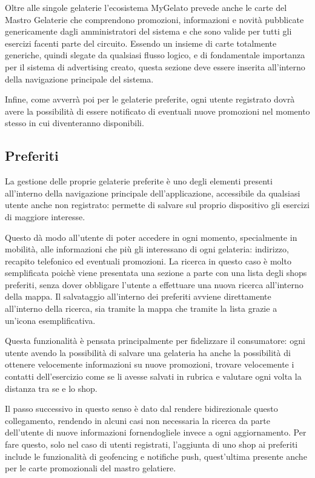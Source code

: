 Oltre alle singole gelaterie l'ecosistema MyGelato prevede anche le
carte del Mastro Gelaterie che comprendono promozioni, informazioni
e novità pubblicate genericamente dagli amministratori del sistema
e che sono valide per tutti gli esercizi facenti parte del circuito.
Essendo un insieme di carte totalmente generiche, quindi slegate da
qualsiasi flusso logico, e di fondamentale importanza per il sistema
di advertising creato, questa sezione deve essere inserita all'interno
della navigazione principale del sistema.\bigskip{}

Infine, come avverrà poi per le gelaterie preferite, ogni utente registrato
dovrà avere la possibilità di essere notificato di eventuali nuove
promozioni nel momento stesso in cui diventeranno disponibili.

\subsection{Preferiti}

La gestione delle proprie gelaterie preferite è uno degli elementi
presenti all'interno della navigazione principale dell'applicazione,
accessibile da qualsiasi utente anche non registrato: permette di
salvare sul proprio dispositivo gli esercizi di maggiore interesse.

Questo dà modo all'utente di poter accedere in ogni momento, specialmente
in mobilità, alle informazioni che più gli interessano di ogni gelateria:
indirizzo, recapito telefonico ed eventuali promozioni. La ricerca
in questo caso è molto semplificata poichè viene presentata una sezione
a parte con una lista degli shops preferiti, senza dover obbligare
l'utente a effettuare una nuova ricerca all'interno della mappa. Il
salvataggio all'interno dei preferiti avviene direttamente all'interno
della ricerca, sia tramite la mappa che tramite la lista grazie a
un'icona esemplificativa.\bigskip{}

Questa funzionalità è pensata principalmente per fidelizzare il consumatore:
ogni utente avendo la possibilità di salvare una gelateria ha anche
la possibilità di ottenere velocemente informazioni su nuove promozioni,
trovare velocemente i contatti dell'esercizio come se li avesse salvati
in rubrica e valutare ogni volta la distanza tra se e lo shop.\bigskip{}

Il passo successivo in questo senso è dato dal rendere bidirezionale
questo collegamento, rendendo in alcuni casi non necessaria la ricerca
da parte dell'utente di nuove informazioni fornendogliele invece a
ogni aggiornamento. Per fare questo, solo nel caso di utenti registrati,
l'aggiunta di uno shop ai preferiti include le funzionalità di geofencing
e notifiche push, quest'ultima presente anche per le carte promozionali
del mastro gelatiere.

